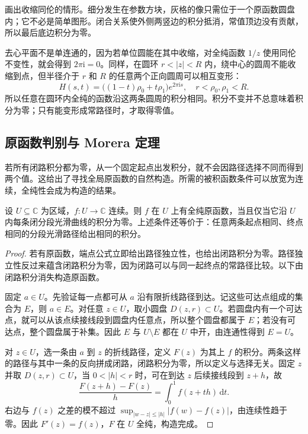 画出收缩同伦的情形。细分发生在参数方块，灰格的像只需位于一个原函数圆盘内；它不必是简单图形。闭合关系使外侧两竖边的积分抵消，常值顶边没有贡献，所以最后底边积分为零。

\ProseParagraphBreak

去心平面不是单连通的，因为若单位圆能在其中收缩，对全纯函数 \(1/z\) 使用同伦不变性，就会得到 \(2\pi\mathrm{i}=0\)。同样，在圆环 \(r<|z|<R\) 内，绕中心的圆周不能收缩到点，但半径介于 \(r\) 和 \(R\) 的任意两个正向圆周可以相互变形：
\[
 H(s,t)=\bigl((1-t)\rho_0+t\rho_1\bigr)e^{2\pi\mathrm{i}s},
 \quad r<\rho_0,\rho_1<R.
\]
所以任意在圆环内全纯的函数沿这两条圆周的积分相同。积分不变并不总意味着积分为零；只有能变形成常路径时，才取得零值。

\subsection{原函数判别与 Morera 定理}
\label{b3:subsec:020204}

若所有闭路积分都为零，从一个固定起点出发积分，就不会因路径选择不同而得到两个值。这给出了寻找全局原函数的自然构造。所需的被积函数条件可以放宽为连续，全纯性会成为构造的结果。

\begin{proposition}[原函数判别准则]\label{b3:prop:02-primitive-criterion}
设 \(U\subseteq\mathbb C\) 为区域，\(f:U\to\mathbb C\) 连续。则 \(f\) 在 \(U\) 上有全纯原函数，当且仅当它沿 \(U\) 内每条闭分段光滑曲线的积分为零。上述条件还等价于：任意两条起点相同、终点相同的分段光滑路径给出相同的积分。
\end{proposition}
\begin{proof}
若有原函数，端点公式立即给出路径独立性，也给出闭路积分为零。路径独立性反过来蕴含闭路积分为零，因为闭路可以与同一起终点的常路径比较。以下由闭路积分消失构造原函数。

固定 \(a\in U\)。先验证每一点都可从 \(a\) 沿有限折线路径到达。记这些可达点组成的集合为 \(E\)，则 \(a\in E\)。对任意 \(z\in U\)，取小圆盘 \(D(z,r)\subset U\)。若圆盘内有一个可达点，就可以从该点续接线段到圆盘内任意点，所以整个圆盘都属于 \(E\)；若没有可达点，整个圆盘属于补集。因此 \(E\) 与 \(U\setminus E\) 都在 \(U\) 中开，由连通性得到 \(E=U\)。

对 \(z\in U\)，选一条由 \(a\) 到 \(z\) 的折线路径，定义 \(F(z)\) 为其上 \(f\) 的积分。两条这样的路径与其中一条的反向拼成闭路，闭路积分为零，所以定义与选择无关。固定 \(z\) 并取 \(D(z,r)\subset U\)，当 \(0<|h|<r\) 时，可在到达 \(z\) 后续接线段到 \(z+h\)，故
\[
 \frac{F(z+h)-F(z)}h
 =\int_0^1f(z+th)\,\mathrm{d}t.
\]
右边与 \(f(z)\) 之差的模不超过
\(\sup_{|w-z|\le|h|}|f(w)-f(z)|\)，由连续性趋于零。因此 \(F'(z)=f(z)\)，\(F\) 在 \(U\) 全纯，构造完成。
\end{proof}

